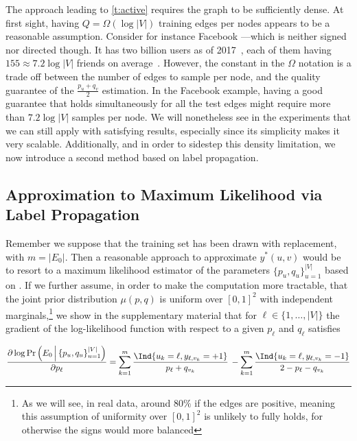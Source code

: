 \medskip

The approach leading to \autoref{t:active} requires the graph to be sufficiently dense. At first sight,
having $Q = \Omega(\log|V|)$ training edges per nodes appears to be a reasonable assumption.
Consider for instance Facebook ---which is neither signed nor directed though. It has two billion
users as of 2017~,
each of them having $155\approx 7.2\log|V|$ friends on average~\autocite{facebookFriend16}. However,
the constant in the $\Omega$ notation is a trade off between the number of edges to sample per
node, and the quality guarantee of the $\frac{p_u+q_v}{2}$ estimation. In the Facebook example,
having a good guarantee that holds simultaneously for all the test edges might require more than
$7.2\log|V|$ samples per node. We will nonetheless see in the experiments that we can still apply
\usrule{} with satisfying results, especially since its simplicity makes it very scalable.
Additionally, and in order to sidestep this density limitation, we now introduce a second method
based on label propagation.

\subsection{Approximation to Maximum Likelihood via Label Propagation}\label{ss:passive}

Remember we suppose that the training set \trainset{} has been drawn \uar{} with replacement, with
$m = |E_0|$. Then a reasonable approach to approximate $y^*(u,v)$ would be to resort to a maximum
likelihood estimator of the parameters $\{p_u, q_u\}_{u=1}^{|V|}$ based on \trainset{}.
If we further assume, in order to make the computation more tractable, that
the joint prior distribution $\mu(p,q)$ is uniform over $[0,1]^2$ with
independent marginals,\footnote{As we will see, in real data, around $80\%$ if the edges are
positive, meaning this assumption of uniformity over $[0,1]^2$ is unlikely to fully holds, for
otherwise the signs would more balanced}
we show in the supplementary material  that for $\ell \in \{1,
\ldots, |V|\}$ the gradient of the log-likelihood function with respect to a given $p_\ell$ and
$q_\ell$ satisfies

\begin{equation}\label{e:mlp}
\frac{\partial \log \Pr\left(E_0 \,\Big|\, \{p_u, q_u\}_{u=1}^{|V|}\right)}{\partial p_{\ell}}
=
\sum_{k=1}^m
\frac{\Ind{u_k = \ell,y_{\ell,v_k}=+1}}{p_{\ell}+q_{v_k}}\,
- \sum_{k=1}^m
\frac{\Ind{u_k = \ell,y_{\ell,v_k}=-1}}{2-p_{\ell}-q_{v_k}}
\end{equation}

